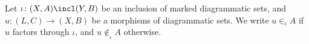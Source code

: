 

\begin{dfn}
    Let \( \iota \colon (X, A) \incl (Y, B) \) be an inclusion of marked diagrammatic sets, and \( u \colon (L, C) \to (X, B) \) be a morphisms of diagrammatic sets. 
    We write \( u \in_\iota A \) if \( u \) factors through \( \iota \), and \( u \notin_\iota A \) otherwise.
\end{dfn}

